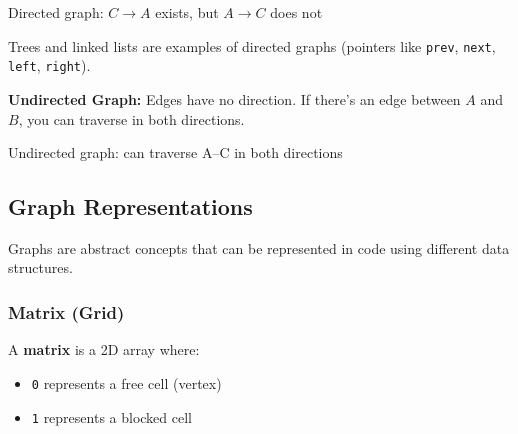 \begin{center}

{\small Directed graph: $C \to A$ exists, but $A \to C$ does not}
\end{center}

Trees and linked lists are examples of directed graphs (pointers like \texttt{prev}, \texttt{next}, \texttt{left}, \texttt{right}).

\textbf{Undirected Graph:}
Edges have no direction. If there's an edge between $A$ and $B$, you can traverse in both directions.

\begin{center}

{\small Undirected graph: can traverse A--C in both directions}
\end{center}

\subsection{Graph Representations}

Graphs are abstract concepts that can be represented in code using different data structures.

\subsubsection{Matrix (Grid)}

A \textbf{matrix} is a 2D array where:
\begin{itemize}
  \item \texttt{0} represents a free cell (vertex)
  \item \texttt{1} represents a blocked cell
\end{itemize}

